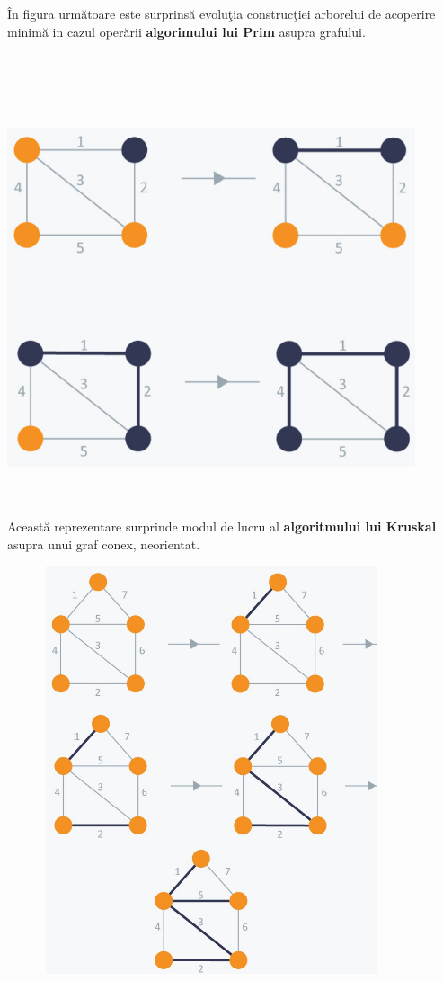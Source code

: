 \documentclass[14pt]{article}
\begin{document}
\^In figura urm\u{a}toare este surprins\u{a} evolu\c tia construc\c tiei arborelui de acoperire minim\u{a} in cazul oper\u{a}rii \textbf{algorimului lui Prim} asupra grafului.
\\
\\
\\
\\


\includegraphics[width = 12cm, height = 12cm]{prim}

\newpage

Aceast\u{a} reprezentare surprinde modul de lucru al \textbf{algoritmului lui Kruskal} asupra unui graf conex, neorientat.

\vspace{10mm}

\includegraphics[width = 12cm, height = 12cm]{kruskal}
\end{document}
